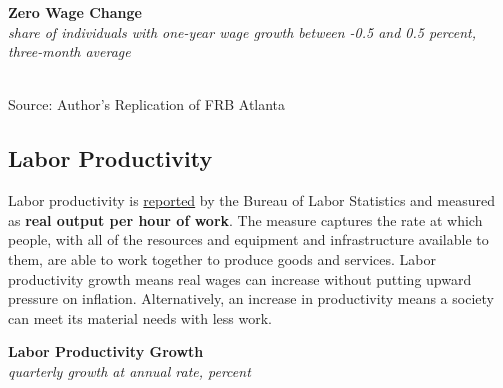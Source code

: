 \documentclass{report}
\makeatletter
\newcommand{\tbllink}[1]{\href{https://raw.githubusercontent.com/bdecon/US-chartbook/master/chartbook/data/#1}{\faTable}}
\newcommand*\short[1]{\expandafter\@gobbletwo\number\numexpr#1\relax}
\newcommand{\dateaxisticks}{
		date coordinates in=x, axis line style={draw=none},
		xmax={2024-01-31},
		max space between ticks=40,	    
		xtick={{1990-01-01}, {1992-01-01}, {1994-01-01}, 
			{1996-01-01}, {1998-01-01}, {2000-01-01}, 
			{2002-01-01}, {2004-01-01}, {2006-01-01},
			{2008-01-01}, {2010-01-01}, {2012-01-01}, {2014-01-01},
		    {2016-01-01}, {2018-01-01}, {2020-01-01}, {2022-01-01}, 
		    {2024-01-01}, {2026-01-01}},
		minor xtick={{1989-01-01}, {1991-01-01}, {1993-01-01},
			{1995-01-01}, {1997-01-01}, {1999-01-01}, 
			{2001-01-01}, {2003-01-01}, {2005-01-01}, {2007-01-01},
		    {2009-01-01}, {2011-01-01}, {2013-01-01}, {2015-01-01},
		    {2017-01-01}, {2019-01-01}, {2021-01-01}, {2023-01-01}, 
		    {2025-01-01}, {2027-01-01}},
		enlarge y limits={0.06}, enlarge x limits={0.01},
		xticklabel style={align=center, yshift=-2pt}, tick label style={inner sep=0pt},
		}
\newcommand{\bbar}[2]{extra #1 ticks = {{#2}}, extra #1 tick labels = ,
		extra #1 tick style = {grid=major, grid style={thick, black!25}},}
\newcommand{\stdline}[4]{\addplot[very thick, no markers, color=#1] 
		table [x=#2, y=#3, col sep=comma] {#4};	}
\newcommand{\rebars}{
		\fill[color=black!10] (axis cs:{2007-12-01},\pgfkeysvalueof{/pgfplots/ymin}) 
			rectangle (axis cs:{2009-07-01}, \pgfkeysvalueof{/pgfplots/ymax});
		\fill[color=black!10] (axis cs:{2001-03-01},\pgfkeysvalueof{/pgfplots/ymin}) 
			rectangle (axis cs:{2001-11-01}, \pgfkeysvalueof{/pgfplots/ymax});
		\fill[color=black!10] (axis cs:{2020-02-01},\pgfkeysvalueof{/pgfplots/ymin}) 
			rectangle (axis cs:{2020-05-01}, \pgfkeysvalueof{/pgfplots/ymax});}
\makeatother
\begin{document}
{\begin{minipage}{1.0\textwidth}

\vspace{1mm}

\normalsize \textbf{Zero Wage Change}\\
\footnotesize{\textit{share of individuals with one-year wage growth between -0.5 and 0.5 percent, three-month average}}\\
\hspace*{-1mm} \\
\footnotesize{Source: Author's Replication of FRB Atlanta} \hfill \tbllink{atl_wgt.csv}
\end{minipage}
\newpage
\vspace*{-10mm}

\begin{minipage}{1.0\textwidth}
\subsection*{Labor Productivity} 
\hypertarget{labprod}{\label{labprod}}
\small Labor productivity is \href{https://www.bls.gov/news.release/prod2.nr0.htm}{reported} by the Bureau of Labor Statistics and measured as \textbf{real output per hour of work}. The measure captures the rate at which people, with all of the resources and equipment and infrastructure available to them, are able to work together to produce goods and services. Labor productivity growth means real wages can increase without putting upward pressure on inflation. Alternatively, an increase in productivity means a society can meet its material needs with less work.
\end{minipage}

\begin{minipage}{0.34\textwidth}
\small 
\end{minipage} \hspace{5mm} \begin{minipage}{0.37\textwidth}
\normalsize \textbf{Labor Productivity Growth}\\
\footnotesize{\textit{quarterly growth at annual rate, percent}}
\vspace{2.15cm}


\end{minipage}}
\end{document}

